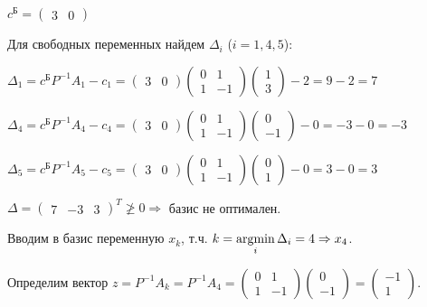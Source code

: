 \begin{enumerate}[leftmargin=*]
$c^\text{Б} = 
\begin{pmatrix}
	3 & 0
\end{pmatrix}$

Для свободных переменных найдем $\Delta_i$ ($i = 1, 4, 5$):

$\Delta_1 = c^\text{Б} P^{-1} A_1 - c_1 =
\begin{pmatrix}
	3 & 0
\end{pmatrix}
\begin{pmatrix}
	0 & 1 \\
	1 & -1
\end{pmatrix}
\begin{pmatrix}
	1 \\
	3
\end{pmatrix} - 2 = 
9 - 2 = 7$

$\Delta_4 = c^\text{Б} P^{-1} A_4 - c_4 =
\begin{pmatrix}
	3 & 0
\end{pmatrix}
\begin{pmatrix}
	0 & 1 \\
	1 & -1
\end{pmatrix}
\begin{pmatrix}
	0 \\
	-1
\end{pmatrix} - 0 = -3 - 0 = -3$

$\Delta_5 = c^\text{Б} P^{-1} A_5 - c_5 =
\begin{pmatrix}
	3 & 0
\end{pmatrix}
\begin{pmatrix}
	0 & 1 \\
	1 & -1 
\end{pmatrix}
\begin{pmatrix}
	0 \\
	1
\end{pmatrix} - 0 = 3 - 0 = 3$

$\Delta = \begin{pmatrix} 7 & -3 & 3 \end{pmatrix}^T \ngeqslant 0 \Rightarrow$ базис не оптимален. 

Вводим в базис переменную $x_k$, т.ч. $k = \operatorname*{argmin}\limits_i\Delta_i = 4 \Rightarrow x_4$.

Определим вектор $z = P^{-1} A_k = P^{-1} A_4 = 
\begin{pmatrix}
	0 & 1 \\
	1 & -1
\end{pmatrix}
\begin{pmatrix}
	0 \\
	-1
\end{pmatrix} =
\begin{pmatrix}
	-1 \\
	1
\end{pmatrix}$.


\end{enumerate}
